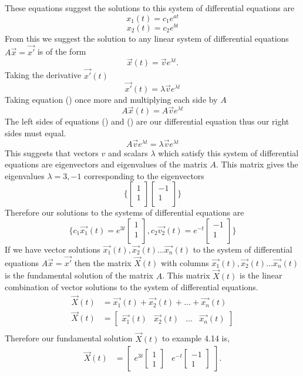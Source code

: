 These equations suggest the solutions to this system of differential equations are 
\[x_1(t) = c_1e^{at}\]
\[x_2(t) = c_2e^{bt}\]
From this we suggest the solution to any linear system of differential equations $A\vec{x} = \vec{x'}$ is of the form 
\[\vec{x}(t) = \vec{v}e^{\lambda t}.\]
Taking the derivative $\vec{x'}(t)$
\[\vec{x'}(t) = \lambda \vec{v}e^{\lambda t}\]
Taking equation () once more and multiplying each side by $A$
\[A \vec{x}(t) = A \vec{v}e^{\lambda t}\]
The left sides of equations () and () are our differential equation thus our right sides must equal.
\[A\vec{v}e^{\lambda t} = \lambda \vec{v}e^{\lambda t}\]
This suggests that vectors $v$ and scalars $\lambda$ which satisfy this system of differential equations are eigenvectors and eigenvalues of the matrix $A$.
\example{
\[\frac{dx}{dt} = \begin{bmatrix}
    2 & 1 \\
    1 & 2 \\
\end{bmatrix} x\]
}
\noindent This matrix gives the eigenvalues $\lambda = 3, -1$ corresponding to the eigenvectors
\[\{\begin{bmatrix}
    1 \\
    1 \\
\end{bmatrix}
\begin{bmatrix}
    -1 \\
    1 \\
\end{bmatrix}\}\]
Therefore our solutions to the systems of differential equations are
\[\{c_1\vec{x_1}(t) = e^{3t} \begin{bmatrix}
    1 \\
    1 \\
\end{bmatrix},
c_2\vec{v_2}(t) = e^{-t}\begin{bmatrix}
    -1 \\
    1 \\
\end{bmatrix}\}\]
If we have vector solutions $\vec{x_1}(t), \vec{x_2}(t) \hdots \vec{x_n}(t)$ to the system of differential equations $A\vec{x} = \vec{x'}$ then the matrix $\vec{X}(t)$ with columns $\vec{x_1}(t), \vec{x_2}(t) \hdots \vec{x_n}(t)$ is the fundamental solution of the matrix $A$.
This matrix $\vec{X}(t)$ is the linear combination of vector solutions to the system of differential equations. 
\begin{align*}
\vec{X}(t) &= \vec{x_1}(t) + \vec{x_2}(t) + \hdots + \vec{x_n}(t) \\
\vec{X}(t) &= \begin{bmatrix} \vec{x_1}(t) & \vec{x_2}(t) & \hdots & \vec{x_n}(t) \end{bmatrix} \\
\end{align*}
Therefore our fundamental solution $\vec{X}(t)$ to example 4.14 is,
\begin{align*}
\vec{X}(t) &= \begin{bmatrix} e^{3t} \begin{bmatrix} 1 \\ 1 \end{bmatrix} & e^{-t} \begin{bmatrix} -1 \\ 1 \end{bmatrix} \end{bmatrix}. \\
\end{align*}



